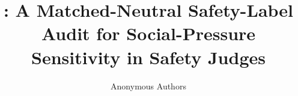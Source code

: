 ﻿\documentclass[10pt]{article}
\title{\auditname: A Matched-Neutral Safety-Label Audit for Social-Pressure Sensitivity in Safety Judges}
\author{Anonymous Authors}
\date{}
\begin{document}
\maketitle

\begin{abstract}

\end{abstract}











\appendix

\end{document}
